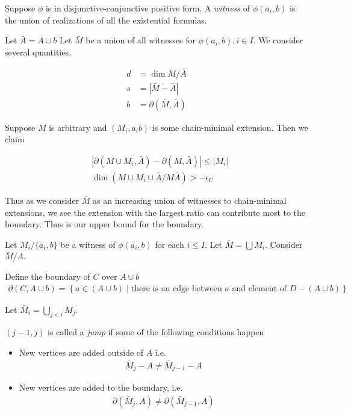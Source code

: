\documentclass{amsart}
\newcommand{\curly}[1]{\left\{#1\right\}}
\newcommand{\abs}[1]{\left|#1\right|}
\begin{document}
\begin{Definition}
	Suppose $\phi$ is in disjunctive-conjunctive positive form.
	A \emph{witness} of $\phi(a_i, b)$ is the union of realizations of all the existential formulas.
\end{Definition}

Let $\bar A = A \cup b$
Let $\bar M$ be a union of all witnesses for $\phi(a_i, b), i \in I$.
We consider several quantities.

\begin{Definition}
	\begin{align*}
		d &= \dim \bar M / \bar A \\
		s &= |\bar M - \bar A| \\
		b &= \partial(\bar M, \bar A)
	\end{align*}
\end{Definition}

Suppose $M$ is arbitrary and $(M_i, a_i b)$ is some chain-minimal extension.
Then we claim
\begin{Claim}
	\begin{align*}
		&\abs{\partial(M \cup M_i, \bar A) - \partial(M, \bar A)} \leq |M_i| \\
		&\dim(M \cup M_i \cup \bar A / M \bar A) > -\epsilon_U
	\end{align*}
\end{Claim}

Thus as we consider $\bar M$ as an increasing union of witnesses to chain-minimal extensions, we see the extension with the largest ratio can contribute most to the boundary.
Thus is our upper bound for the boundary.

Let $M_i / \{a_i, b\}$ be a witness of $\phi(a_i, b)$ for each $i \leq I$.
Let $\bar M = \bigcup M_i$.
Consider $\bar M / A$.

\begin{Definition}
	Define the boundary of $C$ over $A \cup b$
	\begin{align*}
		\partial(C, A \cup b) = \curly{a \in (A \cup b) \mid \text{there is an edge between $a$ and element of $D - (A \cup b)$}}
	\end{align*}
\end{Definition}

Let $\bar M_i = \bigcup_{j < i} M_j$.

\begin{Definition}
	$(j-1, j)$ is called a \emph{jump} if some of the following conditions happen
	\begin{itemize}
		\item New vertices are added outside of $A$ i.e.
			\begin{align*}
				\bar M_j - A \neq \bar M_{j-1} - A
			\end{align*}
		\item New vertices are added to the boundary, i.e.
			\begin{align*}
				\partial(\bar M_j, A) \neq \partial(\bar M_{j-1}, A)
			\end{align*}
	\end{itemize}
\end{Definition}
\end{document}

